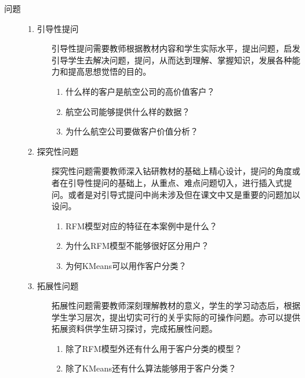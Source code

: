 \documentclass[12pt,a4paper,openany,cap]{ctexbook}
\begin{document}
\begin{description}
\item[问题]
  \begin{minipage}[t]{0.8\linewidth}
    \begin{description}
    \item[1. 引导性提问]             
引导性提问需要教师根据教材内容和学生实际水平，提出问题，启发引导学生去解决问题，提问，从而达到理解、掌握知识，发展各种能力和提高思想觉悟的目的。
\begin{enumerate}
\item  什么样的客户是航空公司的高价值客户？
\item\label{item:198}  航空公司能够提供什么样的数据？
\item\label{item:199}  为什么航空公司要做客户价值分析？
\end{enumerate}
\item[2. 探究性问题] 
探究性问题需要教师深入钻研教材的基础上精心设计，提问的角度或者在引导性提问的基础上，从重点、难点问题切入，进行插入式提问。或者是对引导式提问中尚未涉及但在课文中又是重要的问题加以设问。
\begin{enumerate}
\item  RFM模型对应的特征在本案例中是什么？
\item\label{item:200}  为什么RFM模型不能够很好区分用户？
\item\label{item:201}  为何KMeans可以用作客户分类？
\end{enumerate}
\item[3. 拓展性问题]
拓展性问题需要教师深刻理解教材的意义，学生的学习动态后，根据学生学习层次，提出切实可行的关乎实际的可操作问题。亦可以提供拓展资料供学生研习探讨，完成拓展性问题。
\begin{enumerate}
\item      除了RFM模型外还有什么用于客户分类的模型？
\item\label{item:202}  除了KMeans还有什么算法能够用于客户分类？ 
\end{enumerate}
    \end{description}
  \end{minipage}


\end{description}
\end{document}
